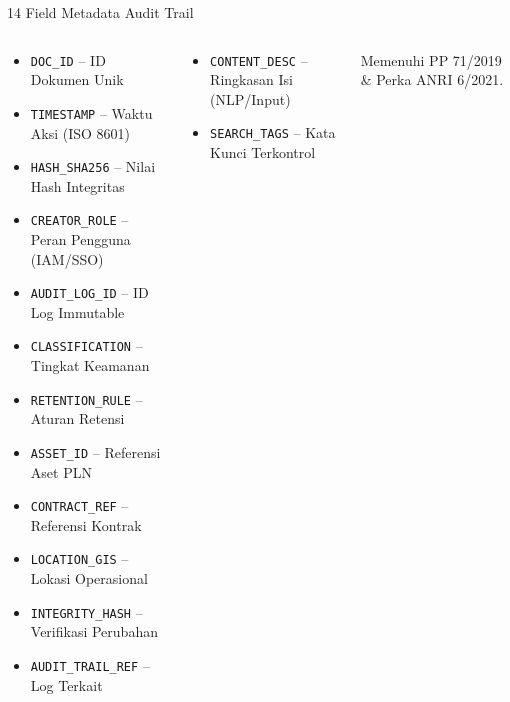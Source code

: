 \documentclass[aspectratio=169,11pt]{beamer}
\begin{document}
\begin{frame}{14 Field Metadata Audit Trail}
    \vspace{0.2cm}
    \begin{columns}[T]
        \begin{premiumbox}
            \tiny
            \begin{itemize}
                \item \texttt{DOC\_ID} -- ID Dokumen Unik
                \item \texttt{TIMESTAMP} -- Waktu Aksi (ISO 8601)
                \item \texttt{HASH\_SHA256} -- Nilai Hash Integritas
                \item \texttt{CREATOR\_ROLE} -- Peran Pengguna (IAM/SSO)
                \item \texttt{AUDIT\_LOG\_ID} -- ID Log Immutable
                \item \texttt{CLASSIFICATION} -- Tingkat Keamanan
                \item \texttt{RETENTION\_RULE} -- Aturan Retensi
                \item \texttt{ASSET\_ID} -- Referensi Aset PLN
                \item \texttt{CONTRACT\_REF} -- Referensi Kontrak
                \item \texttt{LOCATION\_GIS} -- Lokasi Operasional
                \item \texttt{INTEGRITY\_HASH} -- Verifikasi Perubahan
                \item \texttt{AUDIT\_TRAIL\_REF} -- Log Terkait
            \end{itemize}
        \end{premiumbox}
        
        \begin{orangebox}
            \tiny
            \begin{itemize}
                \item \texttt{CONTENT\_DESC} -- Ringkasan Isi (NLP/Input)
                \item \texttt{SEARCH\_TAGS} -- Kata Kunci Terkontrol
            \end{itemize}
        \end{orangebox}
        \vspace{0.1cm}
        \begin{greenbox}[Regulasi]
            \scriptsize Memenuhi PP 71/2019 \& Perka ANRI 6/2021.
        \end{greenbox}
    \end{columns}
\end{frame}
\end{document}

